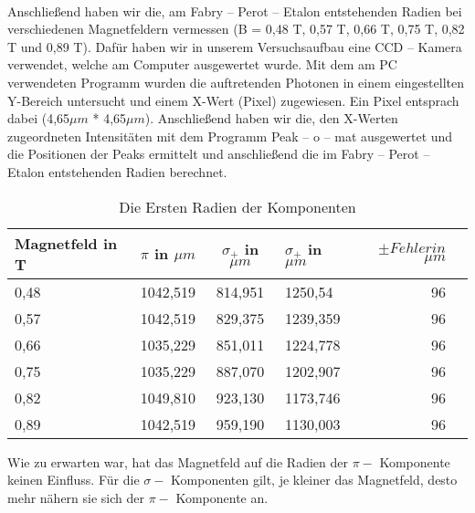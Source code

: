 \documentclass[10pt,a4paper]{article}
\begin{document}
\\
Anschließend haben wir die, am Fabry – Perot – Etalon entstehenden Radien bei verschiedenen Magnetfeldern vermessen (B = 0,48 T, 0,57 T,  0,66 T,  0,75 T, 0,82 T und 0,89 T). Dafür haben wir in unserem Versuchsaufbau eine CCD – Kamera verwendet, welche am Computer ausgewertet wurde. Mit dem am PC verwendeten Programm wurden die auftretenden Photonen in einem eingestellten Y-Bereich untersucht und einem X-Wert (Pixel) zugewiesen. Ein Pixel entsprach dabei (4,65$\mu m$  * 4,65$\mu m$). Anschließend haben wir die, den X-Werten zugeordneten Intensitäten mit dem Programm Peak – o – mat ausgewertet und die Positionen der Peaks ermittelt und anschließend die im Fabry – Perot – Etalon entstehenden Radien berechnet.

\begin{table}[h!]
	\centering
	\begin{tabular}{|l|r|c|lrp{16cm}}\hline
		Magnetfeld in T & $\pi $ in $\mu m$  & $\sigma_{+}$ in $\mu m$ & $\sigma_{+}$ in $\mu m$ & $\pm Fehler in $$\mu m $\\\hline
		0,48 & 1042,519 & 814,951 & 1250,54 & 96	\\
		0,57 & 1042,519 & 829,375 &1239,359 & 96	\\
		0,66 & 1035,229 & 851,011 &1224,778 & 96	\\
		0,75 & 1035,229 & 887,070 &1202,907 & 96 \\
		0,82 & 1049,810 & 923,130 &1173,746 & 96	\\
		0,89 & 1042,519 & 959,190 &1130,003 & 96 \\\hline
		
	\end{tabular}
	\caption{Die Ersten Radien der Komponenten}
	\label{spektrum}
\end{table}


Wie zu erwarten war, hat das Magnetfeld auf die Radien der $\pi - $ Komponente keinen Einfluss. Für die $\sigma - $ Komponenten gilt, je kleiner das Magnetfeld, desto mehr nähern sie sich der $\pi - $ Komponente an.
\end{document}
